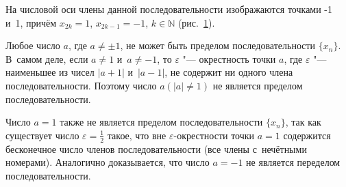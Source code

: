 На числовой оси члены данной последовательности изображаются точками -1 и~1,
причём $x_{2k} = 1$, $x_{2k-1} = -1$, $k \in \mathbb{N}$ (рис.\ \ref{fig:3_1_3}).

\begin{figure}\label{fig:3_1_3}
\end{figure}

Любое число $a$, где $a \ne \pm 1$, не может быть пределом последовательности $\{x_{n}\}$.
В~самом деле, если $a \ne 1$ и~$a \ne -1$, то $\varepsilon$ "--- окрестность точки $a$,
где $\varepsilon$ "--- наименьшее из чисел $|a + 1|$ и~$|a - 1|$, не содержит
ни одного члена последовательности. Поэтому число $a(|a| \ne 1)$ не является
пределом последовательности.

Число $a = 1$ также не является пределом последовательности $\{x_{n}\}$,
так как существует число $\displaystyle \varepsilon = \frac{1}{2}$ такое,
что вне $\varepsilon$-окрестности точки $a = 1$ содержится бесконечное число 
членов последовательности (все члены с~нечётными номерами).
Аналогично доказывается, что число $a = -1$ не является переделом последовательности.

